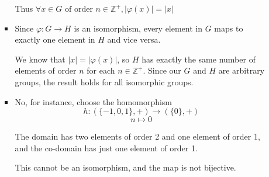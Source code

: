 \documentclass[12pt,letterpaper]{article}
\begin{document}
\begin{enumerate}
\begin{enumerate}
\begin{itemize}
              Thus $\forall x \in G \text{ of order } n \in \mathbb{Z^+}, |\varphi(x)| = |x|$

            \item
              Since $\varphi : G \rightarrow H$ is an isomorphism,
              every element in $G$ maps to exactly one element in $H$ and vice versa.

              We know that $|x| = |\varphi(x)|$,
              so $H$ has exactly the same number of elements of order $n$ for each $n \in \mathbb{Z^+}$.
              Since our $G$ and $H$ are arbitrary groups,
              the result holds for all isomorphic groups.

            \item

              No, for instance, choose the homomorphism
              \[
                h : (\{-1, 0, 1\}, +) \rightarrow (\{0\}, +)
              \]
              \[
                n \mapsto 0
              \]

              The domain has two elements of order 2 and one element of order 1,
              and the co-domain has just one element of order 1.

              This cannot be an isomorphism, and the map is not bijective.
          \end{itemize}
      \end{enumerate}
  \end{enumerate}
\end{document}

